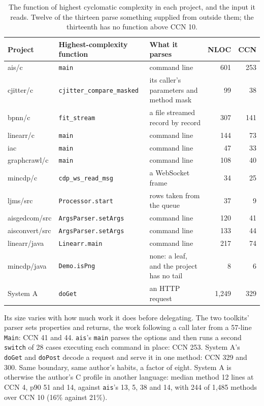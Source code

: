\documentclass[11pt,a4paper]{article}
\begin{document}
\begin{table}[H]
\centering
\small
\begin{tabular}{lllrr}
\toprule
Project & Highest-complexity function & What it parses & NLOC & CCN \\
\midrule
ais/c & \texttt{main} & command line & 601 & 253 \\
cjitter/c & \texttt{cjitter\_compare\_masked} & its caller's parameters and method mask & 99 & 38 \\
bpnn/c & \texttt{fit\_stream} & a file streamed record by record & 307 & 141 \\
linearr/c & \texttt{main} & command line & 144 & 73 \\
iac & \texttt{main} & command line & 47 & 33 \\
graphcrawl/c & \texttt{main} & command line & 108 & 40 \\
mincdp/c & \texttt{cdp\_ws\_read\_msg} & a WebSocket frame & 34 & 25 \\
\addlinespace
ljms/src & \texttt{Processor.start} & rows taken from the queue & 37 & 9 \\
aisgedcom/src & \texttt{ArgsParser.setArgs} & command line & 120 & 41 \\
aisconvert/src & \texttt{ArgsParser.setArgs} & command line & 133 & 44 \\
linearr/java & \texttt{Linearr.main} & command line & 217 & 74 \\
mincdp/java & \texttt{Demo.isPng} & none: a leaf, and the project has no tail & 8 & 6 \\
\addlinespace
System A & \texttt{doGet} & an HTTP request & 1,249 & 329 \\
\bottomrule
\end{tabular}
\caption{The function of highest cyclomatic complexity in each project, and the input it reads. Twelve of the thirteen parse something supplied from outside them; the thirteenth has no function above CCN 10.}
\label{tab:max}
\end{table}

Its size varies with how much work it does before delegating. The two toolkits' parser sets properties and returns, the work following a call later from a 57-line \texttt{Main}: CCN 41 and 44. \texttt{ais}'s \texttt{main} parses the options and then runs a second \texttt{switch} of 28 cases executing each command in place: CCN 253. System A's \texttt{doGet} and \texttt{doPost} decode a request and serve it in one method: CCN 329 and 300. Same boundary, same author's habits, a factor of eight. System A is otherwise the author's C profile in another language: median method 12 lines at CCN 4, p90 51 and 14, against \texttt{ais}'s 13, 5, 38 and 14, with 244 of 1,485 methods over CCN 10 (16\% against 21\%).
\end{document}
